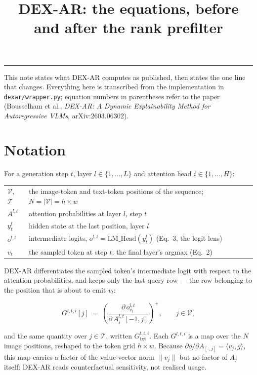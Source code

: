 \documentclass[11pt]{article}
\title{\textbf{DEX-AR: the equations, before and after the rank prefilter}}
\author{}
\date{}
\newcommand{\Vset}{\mathcal{V}}
\newcommand{\Tset}{\mathcal{T}}
\newcommand{\relu}[1]{\left(#1\right)^{+}}
\begin{document}
\maketitle
\vspace{-2.2\baselineskip}

\noindent\rule{\textwidth}{0.4pt}
\vspace{0.4em}

\noindent This note states what DEX-AR computes as published, then states the one
line that changes. Everything here is transcribed from the implementation in
\texttt{dexar/wrapper.py}; equation numbers in parentheses refer to the paper
(Bousselham et al., \emph{DEX-AR: A Dynamic Explainability Method for
Autoregressive VLMs}, arXiv:2603.06302).

\section{Notation}

For a generation step $t$, layer $l \in \{1,\dots,L\}$ and attention head
$i \in \{1,\dots,H\}$:

\begin{tabular}{@{}ll@{}}
\toprule
$\Vset$, $\Tset$ & the image-token and text-token positions of the sequence; $N = |\Vset| = h \times w$ \\
$A^{l,t}$        & attention probabilities at layer $l$, step $t$ \\
$y^{l}_{t}$      & hidden state at the last position, layer $l$ \\
$o^{l,t}$        & intermediate logits, $o^{l,t} = \mathrm{LM\_Head}(y^{l}_{t})$ \quad (Eq.~3, the logit lens) \\
$v_t$            & the sampled token at step $t$: the final layer's argmax \quad (Eq.~2) \\
\bottomrule
\end{tabular}

\medskip
\noindent DEX-AR differentiates the sampled token's intermediate logit with
respect to the attention probabilities, and keeps only the last query row --- the
row belonging to the position that is about to emit $v_t$:

\begin{equation}
G^{l,t,i}[j] \;=\; \relu{\frac{\partial\, o^{l,t}_{v_t}}{\partial\, A^{l,t}_{i}[-1, j]}},
\qquad j \in \Vset ,
\label{eq:grad}
\end{equation}

\noindent and the same quantity over $j \in \Tset$, written $G^{l,t,i}_{\text{txt}}$.
Each $G^{l,t,i}$ is a map over the $N$ image positions, reshaped to the token
grid $h \times w$. Because
$\partial o / \partial A_{[\cdot,j]} = \langle v_j, g\rangle$, this map carries a
factor of the value-vector norm $\lVert v_j \rVert$ but no factor of $A_j$
itself: DEX-AR reads counterfactual sensitivity, not realised usage.
\end{document}
